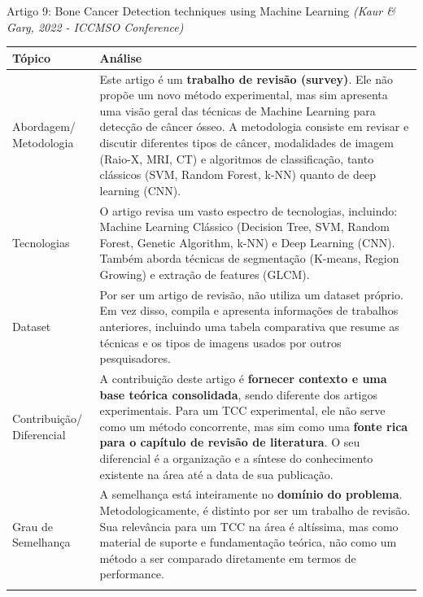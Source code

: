 \documentclass[12pt, a4paper]{article}
\begin{document}
\begin{fichabox}{Artigo 9: Bone Cancer Detection techniques using Machine Learning}
\textit{(Kaur \& Garg, 2022 - ICCMSO Conference)}
\begin{longtable}{@{} B L{10.5cm} @{}}
    \toprule
    \textbf{Tópico} & \textbf{Análise} \\
    \midrule
    \endhead
    
    Abordagem/ Metodologia & Este artigo é um \textbf{trabalho de revisão (survey)}. Ele não propõe um novo método experimental, mas sim apresenta uma visão geral das técnicas de Machine Learning para detecção de câncer ósseo. A metodologia consiste em revisar e discutir diferentes tipos de câncer, modalidades de imagem (Raio-X, MRI, CT) e algoritmos de classificação, tanto clássicos (SVM, Random Forest, k-NN) quanto de deep learning (CNN). \\
    \addlinespace
    
    Tecnologias & O artigo revisa um vasto espectro de tecnologias, incluindo: Machine Learning Clássico (Decision Tree, SVM, Random Forest, Genetic Algorithm, k-NN) e Deep Learning (CNN). Também aborda técnicas de segmentação (K-means, Region Growing) e extração de features (GLCM). \\
    \addlinespace
    
    Dataset & Por ser um artigo de revisão, não utiliza um dataset próprio. Em vez disso, compila e apresenta informações de trabalhos anteriores, incluindo uma tabela comparativa que resume as técnicas e os tipos de imagens usados por outros pesquisadores. \\
    \addlinespace
    
    Contribuição/ Diferencial & A contribuição deste artigo é \textbf{fornecer contexto e uma base teórica consolidada}, sendo diferente dos artigos experimentais. Para um TCC experimental, ele não serve como um método concorrente, mas sim como uma \textbf{fonte rica para o capítulo de revisão de literatura}. O seu diferencial é a organização e a síntese do conhecimento existente na área até a data de sua publicação. \\
    \addlinespace
    
    Grau de Semelhança & A semelhança está inteiramente no \textbf{domínio do problema}. Metodologicamente, é distinto por ser um trabalho de revisão. Sua relevância para um TCC na área é altíssima, mas como material de suporte e fundamentação teórica, não como um método a ser comparado diretamente em termos de performance. \\
    \addlinespace
    

\end{longtable}
\end{fichabox}
\end{document}
